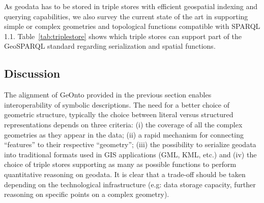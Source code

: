 \documentclass[a4paper,11pt]{report}
\begin{document}
As geodata has to be stored in triple stores with efficient geospatial indexing and querying capabilities, we also survey the current state of the art  in supporting simple or complex geometries and topological functions compatible with SPARQL 1.1. Table~\ref{tab:triplestore} shows which triple stores can support part of the GeoSPARQL standard regarding serialization and spatial functions.



\subsection{Discussion}
The alignment of GeOnto provided in the previous section enables interoperability of symbolic descriptions. The need for a better choice of geometric structure, typically the choice between literal versus structured representations depends on three criteria: (i) the coverage of all the complex geometries as they appear in the data; (ii) a rapid mechanism for connecting ``features'' to their respective ``geometry''; (iii) the possibility to serialize geodata into traditional formats used in GIS applications (GML, KML, etc.) and (iv) the choice of triple stores supporting as many as possible functions to perform quantitative reasoning on geodata. It is clear that a trade-off should be taken depending on the technological infrastructure (e.g: data storage capacity, further reasoning on specific points on a complex geometry).
\end{document}
